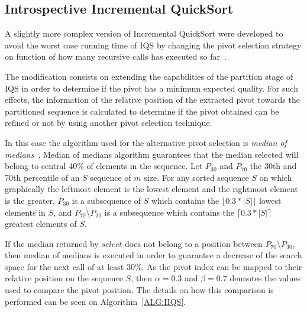 \subsection{Introspective Incremental QuickSort}
\label{SUBSECTION:IIQS}

A slightly more complex version of Incremental QuickSort were developed to avoid the worst case running time of IQS by changing the pivot selection strategy on function of how many recursive calls has executed so far~\cite{7416566}.

The modification consists on extending the capabilities of the partition stage of IQS in order to determine if the pivot has a minimum expected quality. For such effects, the information of the relative position of the extracted pivot towards the partitioned sequence is calculated to determine if the pivot obtained can be refined or not by using another pivot selection technique.

In this case the algorithm used for the alternative pivot selection is \textit{median of medians}~\cite{Blum_Floyd_Pratt_Rivest_Tarjan_1973}. Median of medians algorithm guarantees that the median selected will belong to central 40\% of elements in the sequence. Let $P_{30}$ and $P_{70}$ the 30th and 70th percentile of an $S$ sequence of $m$ size. For any sorted sequence $S$ on which graphically the leftmost element is the lowest element and the rightmost element is the greater, $P_{30}$ is a subsequence of $S$ which contains the $\lfloor0.3*|S|\rfloor$ lowest elements in $S$, and $P_{70} \setminus P_{30}$ is a subsequence which contains the $\lceil0.3*|S|\rceil$ greatest elements of $S$. 

If the median returned by $select$ does not belong to a position between $P_{70} \setminus P_{30}$, then median of medians is executed in order to guarantee a decrease of the search space for the next call of at least 30\%. As the pivot index can be mapped to their relative position on the sequence $S$, then $\alpha=0.3$ and $\beta=0.7$ dennotes the values used to compare the pivot position. The details on how this comparison is performed can be seen on Algorithm~\ref{ALG:IIQS}.

